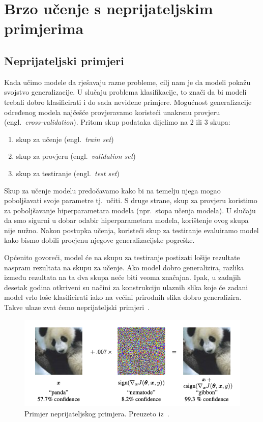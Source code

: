 \documentclass[times, utf8, zavrsni, numeric]{fer}
\begin{document}
\chapter{Brzo učenje s neprijateljskim primjerima}

\section{Neprijateljski primjeri}

Kada učimo modele da rješavaju razne probleme, cilj nam je da modeli pokažu svojstvo generalizacije. 
U slučaju problema klasifikacije, to znači da bi modeli trebali dobro klasificirati i do sada neviđene primjere.
Mogućnost generalizacije određenog modela najčešće provjeravamo koristeći unakrsnu provjeru (engl.\ \textit{cross-validation}).
Pritom skup podataka dijelimo na 2 ili 3 skupa: 

\begin{enumerate}
    \item skup za učenje (engl.\ \textit{train set})
    \item skup za provjeru (engl.\ \textit{validation set})
    \item skup za testiranje (engl.\ \textit{test set})
\end{enumerate}

Skup za učenje modelu predočavamo kako bi na temelju njega mogao poboljšavati svoje parametre tj.\ učiti. 
S druge strane, skup za provjeru koristimo za poboljšavanje hiperparametara modela (npr.\ stopa učenja modela). 
U slučaju da smo sigurni u dobar odabir hiperparametara modela, korištenje ovog skupa nije nužno. 
Nakon postupka učenja, koristeći skup za testiranje evaluiramo model kako bismo dobili procjenu njegove generalizacijske pogreške.

Općenito govoreći, model će na skupu za testiranje postizati lošije rezultate naspram rezultata na skupu za učenje. 
Ako model dobro generalizira, razlika između rezultata na ta dva skupa neće biti veoma značajna. 
Ipak, u zadnjih desetak godina otkriveni su načini za konstrukciju ulaznih slika koje će zadani model vrlo loše klasificirati iako na većini prirodnih slika dobro generalizira. 
Takve ulaze zvat ćemo neprijateljski primjeri~\cite{goodfellow2014explaining}.

\pagebreak

\begin{figure}[htb]
    \centering
    \includegraphics[scale=0.5]{adversarial_example.png}
    \caption{Primjer neprijateljskog primjera. Preuzeto iz~\cite{goodfellow2014explaining}.}
    \label{fig:adv_example}
\end{figure}
\end{document}
